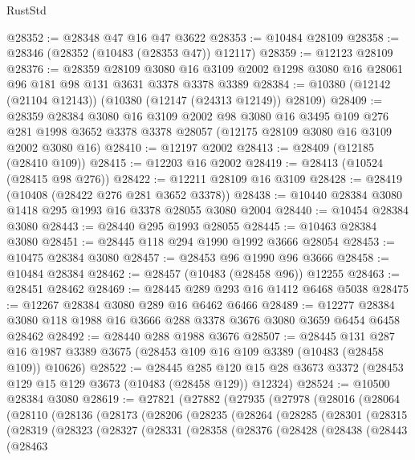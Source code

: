 \begin{lexlean}{RustStd}
\begin{coremodule}
@28352 := @28348 @47 @16 @47 @3622
@28353 := @10484 @28109
@28358 := @28346 (@28352 (@10483 (@28353 @47)) @12117)
@28359 := @12123 @28109
@28376 := @28359
    @28109
    @3080
    @16
    @3109
    @2002
    @1298
    @3080
    @16
    @28061
    @96
    @181
    @98
    @131
    @3631
    @3378
    @3378
    @3389
@28384 := @10380 (@12142 (@21104 @12143)) (@10380 (@12147 (@24313 @12149)) @28109)
@28409 := @28359
    @28384
    @3080
    @16
    @3109
    @2002
    @98
    @3080
    @16
    @3495
    @109
    @276
    @281
    @1998
    @3652
    @3378
    @3378
    @28057
    (@12175 @28109 @3080 @16 @3109 @2002 @3080 @16)
@28410 := @12197 @2002
@28413 := @28409 (@12185 (@28410 @109))
@28415 := @12203 @16 @2002
@28419 := @28413 (@10524 (@28415 @98 @276))
@28422 := @12211 @28109 @16 @3109
@28428 := @28419 (@10408 (@28422 @276 @281 @3652 @3378))
@28438 := @10440 @28384 @3080 @1418 @295 @1993 @16 @3378 @28055 @3080 @2004
@28440 := @10454 @28384 @3080
@28443 := @28440 @295 @1993 @28055
@28445 := @10463 @28384 @3080
@28451 := @28445 @118 @294 @1990 @1992 @3666 @28054
@28453 := @10475 @28384 @3080
@28457 := @28453 @96 @1990 @96 @3666
@28458 := @10484 @28384
@28462 := @28457 (@10483 (@28458 @96)) @12255
@28463 := @28451 @28462
@28469 := @28445 @289 @293 @16 @1412 @6468 @5038
@28475 := @12267 @28384 @3080 @289 @16 @6462 @6466
@28489 := @12277 @28384 @3080 @118 @1988 @16 @3666 @288 @3378 @3676 @3080 @3659 @6454 @6458 @28462
@28492 := @28440 @288 @1988 @3676
@28507 := @28445
    @131
    @287
    @16
    @1987
    @3389
    @3675
    (@28453 @109 @16 @109 @3389 (@10483 (@28458 @109)) @10626)
@28522 := @28445
    @285
    @120
    @15
    @28
    @3673
    @3372
    (@28453 @129 @15 @129 @3673 (@10483 (@28458 @129)) @12324)
@28524 := @10500 @28384 @3080
@28619 := @27821
    (@27882
      (@27935
        (@27978
          (@28016
            (@28064
              (@28110
                (@28136
                  (@28173
                    (@28206
                      (@28235
                        (@28264
                          (@28285
                            (@28301
                              (@28315
                                (@28319
                                  (@28323
                                    (@28327
                                      (@28331
                                        (@28358
                                          (@28376
                                            (@28428
                                              (@28438
                                                (@28443
                                                  (@28463

\end{coremodule}
\end{lexlean}
